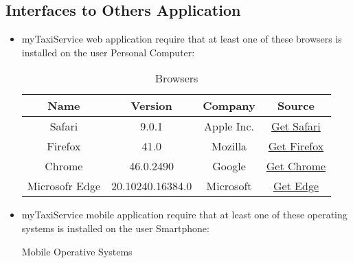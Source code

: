 \documentclass{report}
\begin{document}
		\subsection{Interfaces to Others Application}
			\begin{itemize}
				\item myTaxiService web application require that at least one of these browsers is installed on the user Personal Computer:
			
					\begin{center}
						\begin{table}[h!]
							
							\begin{center}
								\caption{Browsers}
								\label{tab:browsersTable}

								\begin{tabular}{cccc}
									\toprule
									\textbf{Name} & \textbf{Version} & \textbf{Company} & \textbf{Source}\\
									\midrule
									Safari & 9.0.1 & Apple Inc. & \href{http://www.apple.com/safari/}{Get Safari}\\
									\midrule
									Firefox & 41.0 & Mozilla & \href{https://www.mozilla.org/en-US/firefox/new/}{Get Firefox}\\
									\midrule
									Chrome & 46.0.2490 & Google & \href{https://www.google.com/chrome/browser/desktop/}{Get Chrome}\\
									\midrule
									Microsofr Edge & 20.10240.16384.0 & Microsoft & \href{https://www.microsoft.com/en-us/download/details.aspx?id=48126}{Get Edge}\\
									\bottomrule
								\end{tabular}
							\end{center}
							
						\end{table}
					\end{center}

				\item myTaxiService mobile application require that at least one of these operating systems is installed on the user Smartphone:

					\begin{center}
						\begin{table}[h!]
							
							\begin{center}
								\caption{Mobile Operative Systems}
								\label{tab:mobileOSTable}


\end{center}
\end{table}
\end{center}
\end{itemize}
\end{document}
